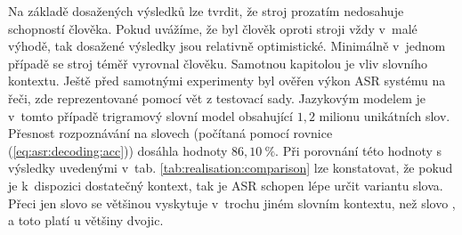 Na základě dosažených výsledků lze tvrdit, že stroj prozatím nedosahuje schopností člověka.
Pokud uvážíme, že byl člověk oproti stroji vždy v~malé výhodě, tak dosažené výsledky jsou relativně optimistické.
Minimálně v~jednom případě se stroj téměř vyrovnal člověku.
Samotnou kapitolou je vliv slovního kontextu.
Ještě před samotnými experimenty byl ověřen výkon ASR systému na  řeči, zde reprezentované pomocí vět z testovací sady.
Jazykovým modelem je v~tomto případě trigramový slovní model obsahující $1,2$ milionu unikátních slov.
Přesnost rozpoznávání na slovech (počítaná pomocí rovnice (\ref{eq:asr:decoding:acc})) dosáhla hodnoty $86,10\ \%$.
Při porovnání této hodnoty s výsledky uvedenými v~tab. \ref{tab:realisation:comparison} lze konstatovat, že pokud je k~dispozici dostatečný kontext, tak je ASR schopen lépe určit variantu slova.
Přeci jen slovo  se většinou vyskytuje v~trochu jiném slovním kontextu, než slovo , a toto platí u většiny dvojic.
